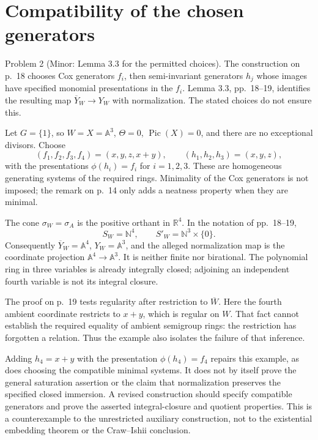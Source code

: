 \documentclass[10pt]{article}
\begin{document}
\section*{Compatibility of the chosen generators}
Problem 2 (Minor: Lemma 3.3 for the permitted choices).  The construction on p. 18 chooses Cox generators \(f_i\), then semi-invariant generators \(h_j\) whose images have specified monomial presentations in the \(f_i\). Lemma 3.3, pp. 18–19, identifies the resulting map \(\overline Y_W\to Y_W\) with normalization. The stated choices do not ensure this.\par
Let \(G=\{1\}\), so \(W=X=\mathbb A^3\), \(\Theta=0\), \(\operatorname{Pic}(X)=0\), and there are no exceptional divisors. Choose \[(f_1,f_2,f_3,f_4)=(x,y,z,x+y),\qquad
 (h_1,h_2,h_3)=(x,y,z),\] with the presentations \(\phi(h_i)=f_i\) for \(i=1,2,3\). These are homogeneous generating systems of the required rings. Minimality of the Cox generators is not imposed; the remark on p. 14 only adds a neatness property when they are minimal.\par
The cone \(\sigma_W=\sigma_A\) is the positive orthant in \(\mathbb R^4\). In the notation of pp. 18–19, \[S_W=\mathbb N^4,\qquad
 S'_W=\mathbb N^3\times\{0\}.\] Consequently \(\overline Y_W=\mathbb A^4\), \(Y_W=\mathbb A^3\), and the alleged normalization map is the coordinate projection \(\mathbb A^4\to\mathbb A^3\). It is neither finite nor birational. The polynomial ring in three variables is already integrally closed; adjoining an independent fourth variable is not its integral closure.\par
The proof on p. 19 tests regularity after restriction to \(\overline W\). Here the fourth ambient coordinate restricts to \(x+y\), which is regular on \(W\). That fact cannot establish the required equality of ambient semigroup rings: the restriction has forgotten a relation. Thus the example also isolates the failure of that inference.\par
Adding \(h_4=x+y\) with the presentation \(\phi(h_4)=f_4\) repairs this example, as does choosing the compatible minimal systems. It does not by itself prove the general saturation assertion or the claim that normalization preserves the specified closed immersion. A revised construction should specify compatible generators and prove the asserted integral-closure and quotient properties. This is a counterexample to the unrestricted auxiliary construction, not to the existential embedding theorem or the Craw–Ishii conclusion.\par
\end{document}
